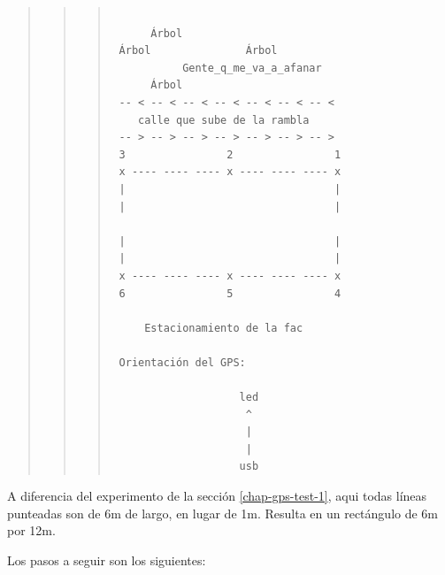 \documentclass[spanish,12pt,a4paper,titlepage]{report}
\begin{document}
\begin{quote}
\begin{quote}
\begin{quote}
\begin{verbatim}

      Árbol              
 Árbol               Árbol
           Gente_q_me_va_a_afanar
      Árbol
 -- < -- < -- < -- < -- < -- < -- <
    calle que sube de la rambla
 -- > -- > -- > -- > -- > -- > -- > 
 3                2                1
 x ---- ---- ---- x ---- ---- ---- x
 |                                 |
 |                                 |
 
 |                                 |
 |                                 |
 x ---- ---- ---- x ---- ---- ---- x
 6                5                4

     Estacionamiento de la fac

 Orientación del GPS:

                    led
                     ^
                     |
                     |
                    usb

\end{verbatim}
\end{quote}
\end{quote}
\end{quote}

A diferencia del experimento de la sección \ref{chap-gps-test-1}, aqui todas líneas punteadas son de 6m de largo, en lugar de 1m. Resulta en un rectángulo de 6m por 12m.

Los pasos a seguir son los siguientes:
\end{document}
